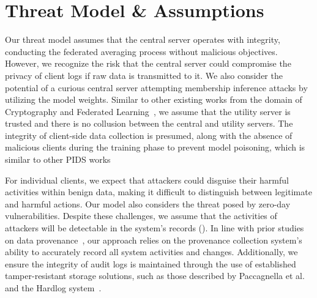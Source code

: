 
\section{Threat Model \& Assumptions}


Our threat model assumes that the central server operates with integrity, conducting the federated averaging process without malicious objectives. However, we recognize the risk that the central server could compromise the privacy of client logs if raw data is transmitted to it. We also consider the potential of a curious central server attempting membership inference attacks by utilizing the model
weights. Similar to other existing works from the domain of Cryptography and Federated Learning~\cite{roy2020crypte,wu2022federated},  we assume that the utility server is trusted and there is no collusion between the central and utility servers. The integrity of client-side data collection is presumed, along with the absence of malicious clients during the training phase to prevent model poisoning, which is similar to other PIDS works~\cite{cheng2023kairos,flash2024,yangprographer,wang2022threatrace,provdetector2020}

For individual clients, we expect that attackers could disguise their harmful activities within benign data, making it difficult to distinguish between legitimate and harmful actions. Our model also considers the threat posed by zero-day vulnerabilities. Despite these challenges, we assume that the activities of attackers will be detectable in the system's records (\logs). In line with prior studies on data provenance~\cite{nodoze2019, priotracker2018, mzx2016, bates2017transparent,omegalog,rapsheet2020,provthings2018,dossier,inam2023sok,poirot2019}, our approach relies on the provenance collection system's ability to accurately record all system activities and changes. Additionally, we ensure the integrity of audit logs is maintained through the use of established tamper-resistant storage solutions, such as those described by Paccagnella et al.~\cite{paccagnella2020custos} and the Hardlog system~\cite{hardlog}.


